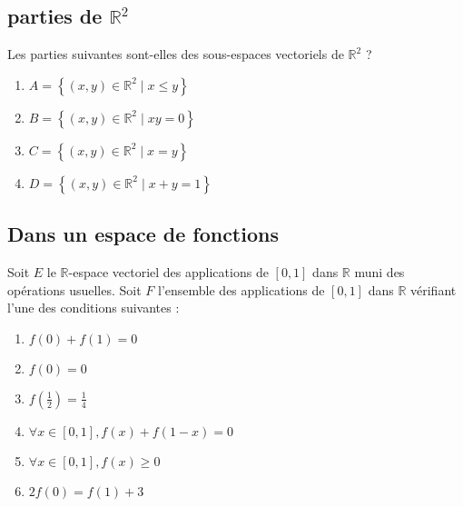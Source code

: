 



\vspace{2em}
\subsection{parties de $\mathbb{R}^2$}

  Les parties suivantes sont-elles des sous-espaces vectoriels de $\mathbb{R}^2$ ?

  \begin{enumerate}
    \item $A=\left\{(x, y) \in \mathbb{R}^2 \mid x \leqslant y\right\}$ 
    \item $B=\left\{(x, y) \in \mathbb{R}^2 \mid x y=0\right\}$ 
    \item $C=\left\{(x, y) \in \mathbb{R}^2 \mid x=y\right\}$ 
    \item $D=\left\{(x, y) \in \mathbb{R}^2 \mid x+y=1\right\}$
  \end{enumerate}


\vspace{1em}

  \subsection{Dans un espace de fonctions}

  Soit $E$ le $\mathbb{R}$-espace vectoriel des applications de $[0,1]$ dans $\mathbb{R}$ muni des opérations usuelles. 
  Soit $F$ l'ensemble des applications de $[0,1]$ dans $\mathbb{R}$ vérifiant l'une des conditions suivantes :

  \begin{enumerate}
    \item $f(0)+f(1)=0$
    \item $f(0)=0$
    \item $f\left(\frac{1}{2}\right)=\frac{1}{4}$
    \item $\forall x \in[0,1], f(x)+f(1-x)=0$
    \item $\forall x \in[0,1], f(x) \geqslant 0$
    \item $2 f(0)=f(1)+3$
  \end{enumerate}

